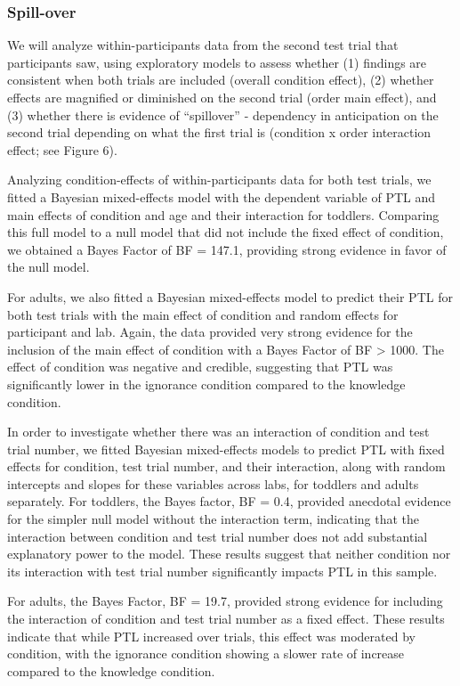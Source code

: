 \documentclass[
  man,floatsintext]{apa6}
\begin{document}
\subsubsection{Spill-over}\label{spill-over}

We will analyze within-participants data from the second test trial that participants saw, using exploratory models to assess whether (1) findings are consistent when both trials are included (overall condition effect), (2) whether effects are magnified or diminished on the second trial (order main effect), and (3) whether there is evidence of ``spillover'' - dependency in anticipation on the second trial depending on what the first trial is (condition x order interaction effect; see Figure 6).

Analyzing condition-effects of within-participants data for both test trials, we fitted a Bayesian mixed-effects model with the dependent variable of PTL and main effects of condition and age and their interaction for toddlers. Comparing this full model to a null model that did not include the fixed effect of condition, we obtained a Bayes Factor of BF = 147.1, providing
strong evidence in favor of the null model.

For adults, we also fitted a Bayesian mixed-effects model to predict their PTL for both test trials with the main effect of condition and random effects for participant and lab. Again, the data provided very strong evidence for the inclusion of the main effect of condition with a Bayes Factor of BF \textgreater{} 1000. The effect of condition was negative and credible, suggesting that PTL was significantly lower in the ignorance condition compared to the knowledge condition.

In order to investigate whether there was an interaction of condition and test trial number, we fitted Bayesian mixed-effects models to predict PTL with fixed effects for condition, test trial number, and their interaction, along with random intercepts and slopes for these variables across labs, for toddlers and adults separately. For toddlers, the Bayes factor, BF = 0.4, provided anecdotal evidence for the simpler null model without the interaction term, indicating that the interaction between condition and test trial number does not add substantial explanatory power to the model. These results suggest that neither condition nor its interaction with test trial number significantly impacts PTL in this sample.

For adults, the Bayes Factor, BF = 19.7, provided strong evidence for including the interaction of condition and test trial number as a fixed effect. These results indicate that while PTL increased over trials, this effect was moderated by condition, with the ignorance condition showing a slower rate of increase compared to the knowledge condition.
\end{document}

